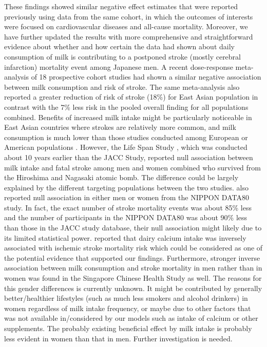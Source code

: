 \documentclass[nutrients,article,submitted,moreauthors,pdftex]{Definitions/mdpi}
\begin{document}
These findings showed similar negative effect estimates that were
reported previously \citep{wang_milk_2015} using data from the same
cohort, in which the outcomes of interests were focused on
cardiovascular diseases and all-cause mortality. Moreover, we have
further updated the results with more comprehensive and straightforward
evidence about whether and how certain the data had shown about daily
consumption of milk is contributing to a postponed stroke (mostly
cerebral infarction) mortality event among Japanese men. A recent
dose-response meta-analysis of 18 prospective cohort studies had shown a
similar negative association \citep{DeGoede2016} between milk
consumption and risk of stroke. The same meta-analysis also reported a
greater reduction of risk of stroke (18\%) for East Asian population in
contrast with the 7\% less risk in the pooled overall finding for all
populations combined. Benefits of increased milk intake might be
particularly noticeable in East Asian countries where strokes are
relatively more common, and milk consumption is much lower than those
studies conducted among European or American populations
\citep{dehghan2018association}. However, the Life Span Study
\citep{sauvaget2003intake}, which was conducted about 10 years earlier
than the JACC Study, reported null association between milk intake and
fatal stroke among men and women combined who survived from the
Hiroshima and Nagasaki atomic bomb. The difference could be largely
explained by the different targeting populations between the two
studies. \citet{kondo2013consumption} also reported null association in
either men or women from the NIPPON DATA80 study. In fact, the exact
number of stroke mortality events was about 85\% less and the number of
participants in the NIPPON DATA80 was about 90\% less than those in the
JACC study database, their null association might likely due to its
limited statistical power. \citet{umesawa2008dietary} reported that
dairy calcium intake was inversely associated with ischemic stroke
mortality risk which could be considered as one of the potential
evidence that supported our findings. Furthermore, stronger inverse
association between milk consumption and stroke mortality in men rather
than in women was found in the Singapore Chinese Health Study
\citep{Talaei_2016} as well. The reasons for this gender differences is
currently unknown. It might be contributed by generally better/healthier
lifestyles (such as much less smokers and alcohol drinkers) in women
regardless of milk intake frequency, or maybe due to other factors that
was not available in/considered by our models such as intake of calcium
or other supplements. The probably existing beneficial effect by milk
intake is probably less evident in women than that in men. Further
investigation is needed.
\end{document}

